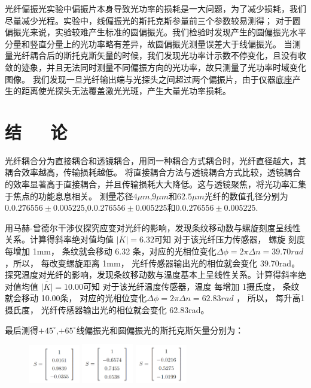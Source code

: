 \documentclass[10pt,a4paper,twoside,UTF8]{ctexart}
\begin{document}
光纤偏振光实验中偏振片本身导致光功率的损耗是一大问题，为了减少损耗，我们尽量减少光程。实验中，线偏振光的斯托克斯参量前三个参数较易测得；
对于圆偏振光来说，实验较难产生标准的圆偏振光。我们检验时发现产生的圆偏振光水平分量和竖直分量上的光功率略有差异，故圆偏振光测量误差大于线偏振光。
当测量光纤耦合后的斯托克斯矢量的时候，我们发现光功率计示数不停变化，且没有收敛的迹象，并且无法同时测量不同偏振方向的光功率，故只测量了光功率时域变化图像。
我们发现一旦光纤输出端与光探头之间超过两个偏振片，由于仪器底座产生的距离使光探头无法覆盖激光光斑，产生大量光功率损耗。

\section{结~~~论}

光纤耦合分为直接耦合和透镜耦合，用同一种耦合方式耦合时，光纤直径越大，其耦合效率越高，传输损耗越低。
将直接耦合方法与透镜耦合方式比较，透镜耦合的效率显著高于直接耦合，并且传输损耗大大降低。这与透镜聚焦，将光功率汇集于焦点的功能息息相关。
测量芯径$4\mu m$,$9\mu m$和$62.5\mu m$光纤的数值孔径分别为$0.0.276556\pm0.005225$,$0.0.276556\pm0.005225$和$0.0.276556\pm0.005225$.

用马赫-曾德尔干涉仪探究应变对光纤的影响，发现条纹移动数与螺旋刻度呈线性关系。计算得斜率绝对值均值 $\overline{|K|}=6.32 $可知 对于该光纤压力传感器， 螺旋
刻度每增加 1mm， 条纹就会移动 6.32 条，对应的光相位变化$\varDelta \phi=2\pi \varDelta n=39.70rad$ ，所以， 每改变螺旋距离 1mm， 光纤传感器输出光的相位就会变化 39.70rad。
探究温度对光纤的影响，发现条纹移动数与温度基本上呈线性关系。计算得斜率绝对值均值 $\overline{|K|}=10.00 $可知 对于该光纤温度传感器，温度
每增加 1摄氏度， 条纹就会移动 10.00条， 对应的光相位变化$\varDelta \phi=2\pi \varDelta n=62.83rad$ ，
所以， 每升高1摄氏度， 光纤传感器输出光的相位就会变化 62.83rad。

最后测得$+45^{\circ}$,$+65^{\circ}$线偏振光和圆偏振光的斯托克斯矢量分别为：
\begin{figure}[htbp]
	\centering
		\includegraphics[width=0.2\textwidth]{img//s1.png}
		\includegraphics[width=0.2\textwidth]{img//s2.png}
		\includegraphics[width=0.2\textwidth]{img//s3.png}
\end{figure}
\end{document}
